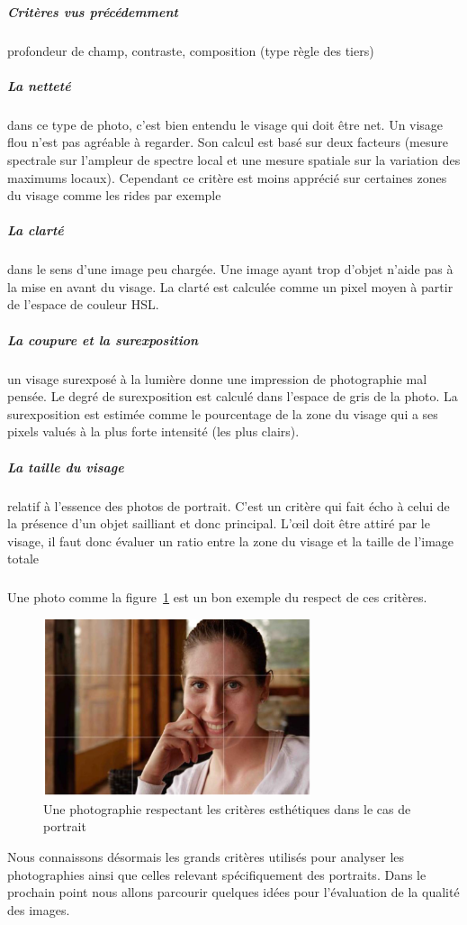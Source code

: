 \documentclass[11pt, french]{report-rd-info}
\begin{document}
\subparagraph{Critères vus précédemment} profondeur de champ, contraste, composition (type règle des tiers)
\subparagraph{La netteté} dans ce type de photo, c'est bien entendu le visage qui doit être net. Un visage flou n'est pas agréable à regarder. Son calcul est basé sur deux facteurs (mesure spectrale sur l’ampleur de spectre local et une mesure spatiale sur la variation des maximums locaux). Cependant ce critère est moins apprécié sur certaines zones du visage comme les rides par exemple
\subparagraph{La clarté} dans le sens d'une image peu chargée. Une image ayant trop d'objet n'aide pas à la mise en avant du visage. La clarté est calculée comme un pixel moyen à partir de l’espace de couleur HSL.
\subparagraph{La coupure et la surexposition} un visage surexposé à la lumière donne une impression de photographie mal pensée. Le degré de  surexposition est calculé dans l’espace de gris de la photo. La surexposition est estimée comme le pourcentage de la zone du visage qui a ses pixels valués à la plus forte intensité (les plus clairs).
\subparagraph{La taille du visage} relatif à l’essence des photos de portrait. C'est un critère qui fait écho à celui de la présence d'un objet sailliant et donc principal. L’œil doit être attiré par le visage, il faut donc évaluer un ratio entre la zone du visage et la taille de l’image totale
\subparagraph*{}
Une photo comme la figure~\ref{fig:VisageAgreable} est un bon exemple du respect de ces critères.

 \begin{figure}
	\centering
	\includegraphics[width=0.7\textwidth]{Images/ea_visageagreable}
	\caption{Une photographie respectant les critères esthétiques dans le cas de portrait\cite{Males2013}}
	\label{fig:VisageAgreable}
\end{figure}

Nous connaissons désormais les grands critères utilisés pour analyser les photographies ainsi que celles relevant spécifiquement des portraits. Dans le prochain point nous allons parcourir quelques idées pour l'évaluation de la qualité des images. 
\end{document}
